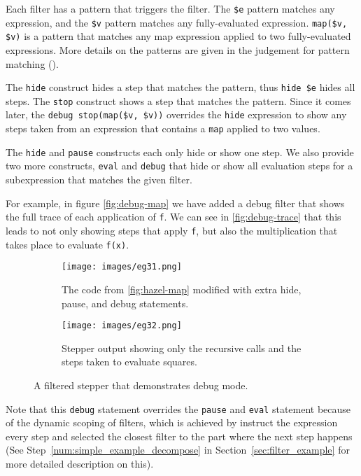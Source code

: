 Each filter has a pattern that triggers the filter. The \verb|$e|
pattern matches any expression, and the \verb|$v| pattern matches any
fully-evaluated expression. \verb|map($v, $v)| is a pattern that
matches any map expression applied to two fully-evaluated
expressions. More details on the patterns are given in the judgement
for pattern matching ().

The \verb|hide| construct hides a step that matches the pattern, thus
\verb|hide $e| hides all steps. The \verb|stop| construct shows a
step that matches the pattern. Since it comes later, the
\verb|debug stop(map($v, $v))| overrides the \verb|hide| expression to show
any steps taken from an expression that contains a \verb|map| applied
to two values.

The \verb|hide| and \verb|pause| constructs each only hide or show one
step. We also provide two more constructs, \verb|eval| and
\verb|debug| that hide or show all evaluation steps for a
subexpression that matches the given filter.

For example, in figure \autoref{fig:debug-map} we have added a debug
filter that shows the full trace of each application of \verb|f|. We
can see in \autoref{fig:debug-trace} that this leads to not only
showing steps that apply \verb|f|, but also the multiplication that
takes place to evaluate \verb|f(x)|.

\begin{figure}
  \centering
  \begin{minipage}{.40\linewidth}
    \begin{subfigure}{\linewidth}
      \texttt{[image: images/eg31.png]}
      \caption{The code from \autoref{fig:hazel-map} modified with extra hide, pause, and debug statements.}
      \label{fig:debug-map}
    \end{subfigure}
  \end{minipage}
  \hfill
  \begin{minipage}{.57\linewidth}
    \begin{subfigure}{\linewidth}
      \texttt{[image: images/eg32.png]}
      \caption{Stepper output showing only the recursive calls and the steps taken to evaluate squares.}
      \label{fig:debug-trace}
    \end{subfigure}
  \end{minipage}
  \caption{A filtered stepper that demonstrates debug mode.}
\end{figure}

Note that this \verb|debug| statement overrides the \verb|pause| and
\verb|eval| statement because of the dynamic scoping of filters, which
is achieved by instruct the expression every step and selected the
closest filter to the part where the next step happens (See
Step~\ref{num:simple_example_decompose} in
Section~\ref{sec:filter_example} for more detailed description on
this).

